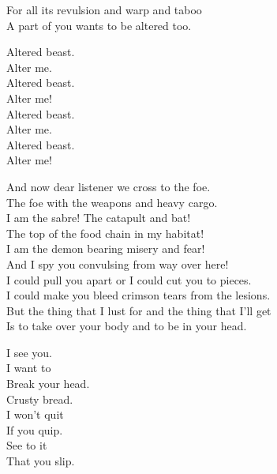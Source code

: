 
For all its revulsion and warp and taboo \\
A part of you wants to be altered too. \\


Altered beast. \\
Alter me. \\
Altered beast. \\
Alter me! \\

Altered beast. \\
Alter me. \\
Altered beast. \\
Alter me! \\





And now dear listener we cross to the foe. \\
The foe with the weapons and heavy cargo. \\

I am the sabre! The catapult and bat! \\
The top of the food chain in my habitat! \\

I am the demon bearing misery and fear! \\
And I spy you convulsing from way over here! \\

I could pull you apart or I could cut you to pieces. \\
I could make you bleed crimson tears from the lesions. \\

But the thing that I lust for and the thing that I'll get \\
Is to take over your body and to be in your head. \\


I see you. \\
I want to \\
Break your head. \\
Crusty bread. \\

I won't quit \\
If you quip. \\
See to it \\
That you slip. \\

